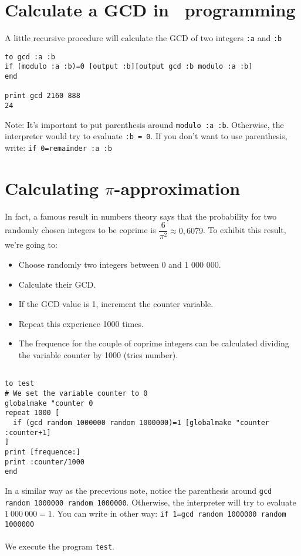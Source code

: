 \section{Calculate a GCD in \logo\ programming}
\noindent A little recursive procedure will calculate the GCD of two integers \texttt{:a} and \texttt{:b}
\begin{verbatim}
to gcd :a :b
if (modulo :a :b)=0 [output :b][output gcd :b modulo :a :b] 
end

print gcd 2160 888 
24
\end{verbatim}
Note: It's important to put parenthesis around \texttt{modulo :a :b}. Otherwise, the interpreter would try to evaluate \texttt{:b = 0}. If you don't want to use parenthesis, write: \texttt{if 0=remainder :a :b}

\section{Calculating $\pi$-approximation}
\noindent In fact, a famous result in numbers theory says that the probability for two randomly chosen integers to be coprime is  $\dfrac{6}{\pi^2}\approx 0,6079$. To exhibit this result, we're going to:
\begin{itemize}
\item Choose randomly two integers between 0 and 1 000 000.
\item Calculate their GCD.
\item If the GCD value is 1, increment the counter variable.
\item Repeat this experience 1000 times.
\item The frequence for the  couple of coprime integers can be calculated dividing the variable counter by 1000 (tries number).
\end{itemize}
\begin{verbatim}

to test
# We set the variable counter to 0
globalmake "counter 0
repeat 1000 [ 
  if (gcd random 1000000 random 1000000)=1 [globalmake "counter :counter+1]
]
print [frequence:]
print :counter/1000
end

\end{verbatim}
In a similar way as the precevious note, notice the parenthesis around \texttt{gcd random 1000000 random 1000000}. Otherwise, the interpreter will try to evaluate $1\ 000\ 000 = 1$. You can write in other way: \texttt{if 1=gcd random 1000000 random 1000000}\\ \\
We execute the program \texttt{test}.
